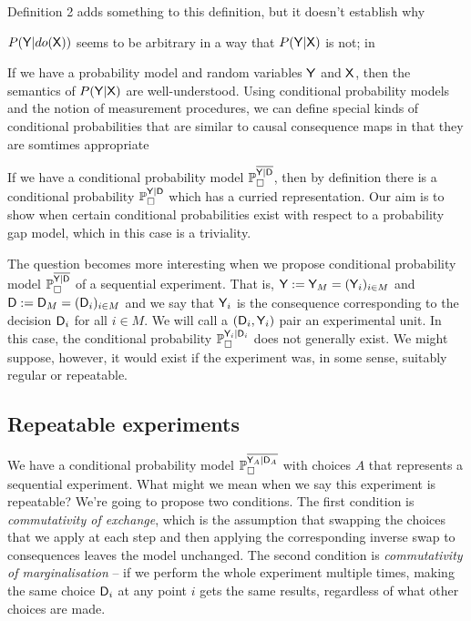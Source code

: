 Definition 2 adds something to this definition, but it doesn't establish why 

$P(\mathsf{Y}|do(\mathsf{X}))$ seems to be arbitrary in a way that $P(\mathsf{Y}|\mathsf{X})$ is not; in 


If we have a probability model and random variables $\mathsf{Y}$ and $\mathsf{X}$, then the semantics of $P(\mathsf{Y}|\mathsf{X})$ are well-understood. Using conditional probability models and the notion of measurement procedures, we can define special kinds of conditional probabilities that are similar to causal consequence maps in that they are somtimes appropriate 




If we have a conditional probability model $\mathbb{P}_\square^{\overline{\mathsf{Y}|\mathsf{D}}}$, then by definition there is a conditional probability $\mathbb{P}_\square^{\mathsf{Y}|\mathsf{D}}$ which has a curried representation. Our aim is to show when certain conditional probabilities exist with respect to a probability gap model, which in this case is a triviality.

The question becomes more interesting when we propose conditional probability model $\mathbb{P}_\square^{\overline{\mathsf{Y}|\mathsf{D}}}$ of a sequential experiment. That is, $\mathsf{Y}:=\mathsf{Y}_M=(\mathsf{Y}_i)_{i\in M}$ and $\mathsf{D}:=\mathsf{D}_M=(\mathsf{D}_i)_{i\in M}$ and we say that $\mathsf{Y}_i$ is the consequence corresponding to the decision $\mathsf{D}_i$ for all $i\in M$. We will call a $(\mathsf{D}_i,\mathsf{Y}_i)$ pair an experimental unit. In this case, the conditional probability $\mathbb{P}_\square^{\mathsf{Y}_i|\mathsf{D}_i}$ does not generally exist. We might suppose, however, it would exist if the experiment was, in some sense, suitably regular or repeatable.

\subsection{Repeatable experiments}

We have a conditional probability model $\mathbb{P}_\square^{\overline{\mathsf{Y}_A|\mathsf{D}_A}}$ with choices $A$ that represents a sequential experiment. What might we mean when we say this experiment is repeatable? We're going to propose two conditions. The first condition is \emph{commutativity of exchange}, which is the assumption that swapping the choices that we apply at each step and then applying the corresponding inverse swap to consequences leaves the model unchanged. The second condition is \emph{commutativity of marginalisation} -- if we perform the whole experiment multiple times, making the same choice $\mathsf{D}_i$ at any point $i$ gets the same results, regardless of what other choices are made.

